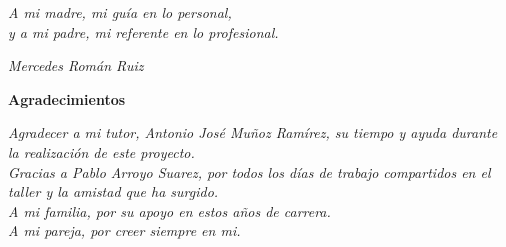 
\thispagestyle{empty}

\begin{minipage}[c][\textheight][c]{\textwidth}
    \raggedleft
    
    \textit{A mi madre, mi guía en lo personal, \\
    y a mi padre, mi referente en lo profesional. \\}
    
    \bigskip
    \emph{Mercedes Román Ruiz}
\end{minipage}

\blankpage


\begin{center}
    {\fontsize{20}{80}\selectfont \textbf{Agradecimientos}\\}
\end{center}
\bigskip

\begin{raggedleft}
    \vspace*{\fill}
    \textit{Agradecer a mi tutor, Antonio José Muñoz Ramírez, su tiempo y ayuda durante la realización de este proyecto.\\}
    \bigskip
    \textit{Gracias a Pablo Arroyo Suarez, por todos los días de trabajo compartidos en el taller y la amistad que ha surgido.\\}
    \bigskip
    \textit{A mi familia, por su apoyo en estos años de carrera.\\}
    \bigskip
    \textit{A mi pareja, por creer siempre en mi.\\}
    \vspace*{\fill}
\end{raggedleft}

\blankpage